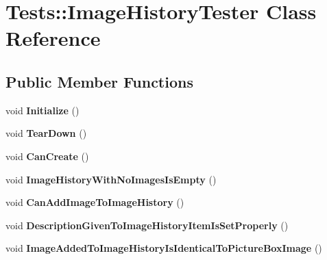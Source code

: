 \hypertarget{class_tests_1_1_image_history_tester}{
\section{Tests::ImageHistoryTester Class Reference}
\label{class_tests_1_1_image_history_tester}
}
\subsection*{Public Member Functions}
\begin{DoxyCompactItemize}
\item 
\hypertarget{class_tests_1_1_image_history_tester_a83053bb3fba36789ee01460efb9240db}{
void {\bfseries Initialize} ()}
\label{class_tests_1_1_image_history_tester_a83053bb3fba36789ee01460efb9240db}

\item 
\hypertarget{class_tests_1_1_image_history_tester_a26c332961aaa53a5e6df4a8517c81fe6}{
void {\bfseries TearDown} ()}
\label{class_tests_1_1_image_history_tester_a26c332961aaa53a5e6df4a8517c81fe6}

\item 
\hypertarget{class_tests_1_1_image_history_tester_af32c9200363754ffa1fe4b213defb729}{
void {\bfseries CanCreate} ()}
\label{class_tests_1_1_image_history_tester_af32c9200363754ffa1fe4b213defb729}

\item 
\hypertarget{class_tests_1_1_image_history_tester_aa8e0b1ffb021bf9fe281f3705c2738fb}{
void {\bfseries ImageHistoryWithNoImagesIsEmpty} ()}
\label{class_tests_1_1_image_history_tester_aa8e0b1ffb021bf9fe281f3705c2738fb}

\item 
\hypertarget{class_tests_1_1_image_history_tester_ad030fbf52d1e3e6292068fcb0acb88a2}{
void {\bfseries CanAddImageToImageHistory} ()}
\label{class_tests_1_1_image_history_tester_ad030fbf52d1e3e6292068fcb0acb88a2}

\item 
\hypertarget{class_tests_1_1_image_history_tester_a54778f924cc0681ec034c8ea78c7b500}{
void {\bfseries DescriptionGivenToImageHistoryItemIsSetProperly} ()}
\label{class_tests_1_1_image_history_tester_a54778f924cc0681ec034c8ea78c7b500}

\item 
\hypertarget{class_tests_1_1_image_history_tester_a1cd8f49636ad6d34f5b43da9e44c2862}{
void {\bfseries ImageAddedToImageHistoryIsIdenticalToPictureBoxImage} ()}
\label{class_tests_1_1_image_history_tester_a1cd8f49636ad6d34f5b43da9e44c2862}


\end{DoxyCompactItemize}
